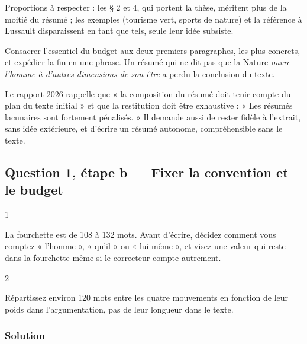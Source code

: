 \documentclass[11pt,a4paper]{article}
\begin{document}
Proportions à respecter : les § 2 et 4, qui portent la thèse, méritent plus de la moitié du résumé ; les exemples (tourisme vert, sports de nature) et la référence à Lussault disparaissent en tant que tels, seule leur idée subsiste.

\begin{piege}

Consacrer l'essentiel du budget aux deux premiers paragraphes, les plus concrets, et expédier la fin en une phrase. Un résumé qui ne dit pas que la Nature \emph{ouvre l'homme à d'autres dimensions de son être} a perdu la conclusion du texte.

\end{piege}

\begin{jury}

Le rapport 2026 rappelle que « la composition du résumé doit tenir compte du plan du texte initial » et que la restitution doit être exhaustive : « Les résumés lacunaires sont fortement pénalisés. » Il demande aussi de rester fidèle à l'extrait, sans idée extérieure, et d'écrire un résumé autonome, compréhensible sans le texte.

\end{jury}

\hypertarget{question-1-uxe9tape-b-fixer-la-convention-et-le-budget}{%
\subsection{Question 1, étape b --- Fixer la convention et le budget}\label{question-1-uxe9tape-b-fixer-la-convention-et-le-budget}}

\begin{indication}{1}

La fourchette est de 108 à 132 mots. Avant d'écrire, décidez comment vous comptez « l'homme », « qu'il » ou « lui-même », et visez une valeur qui reste dans la fourchette même si le correcteur compte autrement.

\end{indication}

\begin{indication}{2}

Répartissez environ 120 mots entre les quatre mouvements en fonction de leur poids dans l'argumentation, pas de leur longueur dans le texte.

\end{indication}

\hypertarget{solution-1}{%
\subsubsection{Solution}\label{solution-1}}
\end{document}
